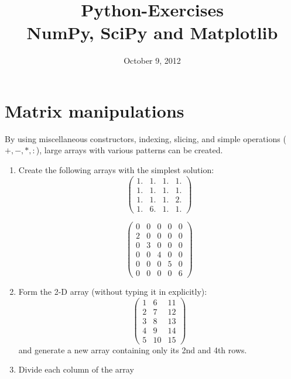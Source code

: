 \documentclass[smallheadings,12pt]{scrartcl}
\begin{document}
\parindent0cm
\pagestyle{myheadings}
\title{Python-Exercises \\ NumPy, SciPy and Matplotlib }
\lstset{language=Python,numbers=left,frame=shadowbox}
\date{October 9, 2012}

\maketitle

\section{Matrix manipulations}

By using miscellaneous constructors, indexing, slicing, and simple operations ($+, -, *, :$), large arrays with various patterns
can be created.
\begin{enumerate}
\item  Create the following arrays with the simplest solution:
\begin{equation}
\left(
  \begin{array}{ccccc}
 1.& 1.& 1.& 1.\\
 1.& 1.& 1.& 1.\\
 1.& 1.& 1.& 2.\\
 1.& 6.& 1.& 1.
\end{array}\right)
\end{equation}

\begin{equation}
\left(
  \begin{array}{cccccc}
 0& 0& 0& 0& 0\\
 2& 0& 0& 0& 0\\
 0& 3& 0& 0& 0\\
 0& 0& 4& 0& 0 \\
 0& 0& 0& 5& 0\\
 0& 0& 0& 0& 6
\end{array}\right)
\end{equation}

\item Form the 2-D array (without typing it in explicitly):
\begin{equation}
\left(
  \begin{array}{ccc}
    1&  6 &11\\
    2&  7 &12\\
    3&  8 &13\\
    4&  9 &14\\
    5& 10 &15
 \end{array}\right)
\end{equation}
    and generate a new array containing only its 2nd and 4th rows.
\item  Divide each column of the array


\end{enumerate}
\end{document}
